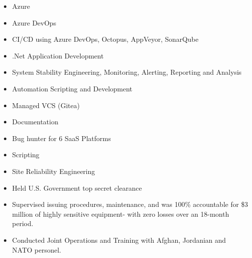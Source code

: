 \documentclass[10pt,a4paper,ragged2e,withhyper]{altacv}
\begin{document}


\makecvheader


\begin{paracol}{2}

\begin{itemize}
\item Azure
\item Azure DevOps
\item CI/CD using Azure DevOps, Octopus, AppVeyor, SonarQube
\item .Net Application Development
\item System Stability Engineering, Monitoring, Alerting, Reporting and Analysis
\item Automation Scripting and Development
\item Managed VCS (Gitea)
\item Documentation
\end{itemize}

\divider

\begin{itemize}
\item Bug hunter for 6 SaaS Platforms
\item Scripting
\item Site Reliability Engineering
\end{itemize}

\divider

\begin{itemize}
\item Held U.S. Government top secret clearance
\item Supervised issuing procedures, maintenance, and was 100\% accountable for \$3 million of highly sensitive equipment- with zero losses over an 18-month period.
\item Conducted Joint Operations and Training with Afghan, Jordanian and NATO personel. 
\end{itemize}


\end{paracol}
\end{document}
